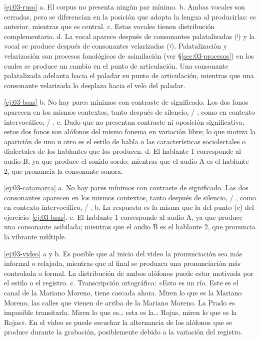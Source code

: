 \begin{solucion}{\ref{ej:03-ruso}}
a. El corpus no presenta ningún par mínimo. b. Ambas vocales son cerradas, pero
se diferencian en la posición que adopta la lengua al producirlas:  es
anterior, mientras que  es central. c. Estas vocales tienen distribución
complementaria. d. La vocal  aparece después de consonantes
palatalizadas (ʲ) y la vocal  se produce después de consonantes
velarizadas (ˠ). Palatalización y velarización son procesos fonológicos de
asimilación (ver §\ref{sec:03-procesos}) en los cuales se produce un cambio en
el punto de articulación. Una consonante
palatalizada adelanta hacia el paladar su punto de articulación, mientras que
una consonante velarizada lo desplaza hacia el velo del paladar.
\end{solucion}

\begin{solucion}{\ref{ej:03-bsas}}
b. No hay pares mínimos con contraste de significado. Los dos fonos aparecen en
los mismos contextos, tanto después de silencio,  / , como
en contexto intervocálico,  / . c. Dado que no presentan
contraste ni oposición significativa, estos dos fonos son alófonos del mismo
fonema en variación libre; lo que motiva la aparición de uno u otro es el estilo
de habla o las características sociolectales o dialectales de los hablantes que
los producen. d. El hablante 1 corresponde al audio B, ya que produce el sonido
sordo; mientras que el audio A es el hablante 2, que pronuncia la consonante
sonora.
\end{solucion}

\begin{solucion}{\ref{ej:03-catamarca}}
a. No hay pares mínimos con contraste de significado. Las dos consonantes
aparecen en los mismos contextos, tanto después de silencio,  /
, como en contexto intervocálico,  / . b. La
respuesta es la misma que la del punto (c) del ejercicio~\ref{ej:03-bsas}. c. El
hablante 1 corresponde al audio A, ya que produce una consonante asibilada;
mientras que el audio B es el hablante 2, que pronuncia la vibrante múltiple.
\end{solucion}

\begin{solucion}{\ref{ej:03-video}}
a y b. Es posible que al inicio del video la pronunciación sea más informal o
relajada, mientras que al final se produzca una pronunciación más controlada o
formal. La distribución de ambos alófonos puede estar motivada por el estilo o
el registro. c. Transcripción ortográfica: «Esto es un río. Este es el canal de
la Mariano Moreno, tiene cascada ahora. Miren lo que es la Mariano Moreno, las
calles que vienen de arriba de la Mariano Moreno. La Prado es imposible
transitarla. Miren lo que es\ldots{} esta es la\ldots{} Rojas, miren lo que es
la Rojas». En el video se puede escuchar la alternancia de los alófonos que se
produce durante la grabación, posiblemente debido a la variación del registro.
\end{solucion}

